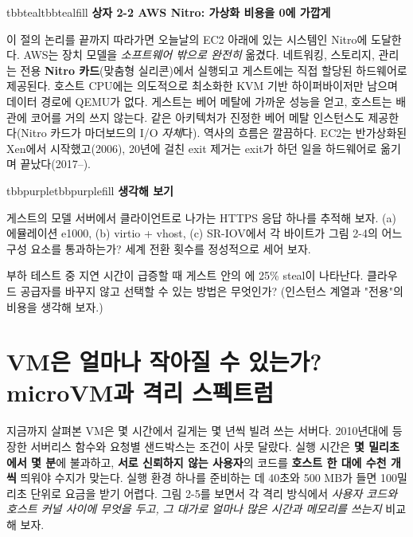 \begin{calloutbox}{tbbteal}{tbbtealfill}
{\normalsize\bfseries\color{tbbx115E59}상자 2-2  AWS Nitro: 가상화 비용을 0에 가깝게}\par\vspace{3pt}
이 절의 논리를 끝까지 따라가면 오늘날의 EC2 아래에 있는 시스템인 Nitro에 도달한다. AWS는 장치 모델을 \textit{소프트웨어 밖으로 완전히} 옮겼다. 네트워킹, 스토리지, 관리는 전용 \textbf{Nitro 카드}(맞춤형 실리콘)에서 실행되고 게스트에는 직접 할당된 하드웨어로 제공된다. 호스트 CPU에는 의도적으로 최소화한 KVM 기반 하이퍼바이저만 남으며 데이터 경로에 QEMU가 없다. 게스트는 베어 메탈에 가까운 성능을 얻고, 호스트는 배관에 코어를 거의 쓰지 않는다. 같은 아키텍처가 진정한 베어 메탈 인스턴스도 제공한다(Nitro 카드가 마더보드의 I/O \textit{자체}다). 역사의 흐름은 깔끔하다. EC2는 반가상화된 Xen에서 시작했고(2006), 20년에 걸친 exit 제거는 exit가 하던 일을 하드웨어로 옮기며 끝났다(2017–).
\end{calloutbox}

\vspace{3.0pt}

\begin{calloutbox}{tbbpurple}{tbbpurplefill}
{\normalsize\bfseries\color{tbbpurple}생각해 보기}\par\vspace{3pt}
\begin{tbbitemize}
  \item 게스트의 모델 서버에서 클라이언트로 나가는 HTTPS 응답 하나를 추적해 보자. (a) 에뮬레이션 e1000, (b) virtio + vhost, (c) SR-IOV에서 각 바이트가 그림 2-4의 어느 구성 요소를 통과하는가? 세계 전환 횟수를 정성적으로 세어 보자.
  \item 부하 테스트 중 지연 시간이 급증할 때 게스트 안의 에 25\% steal이 나타난다. 클라우드 공급자를 바꾸지 않고 선택할 수 있는 방법은 무엇인가? (인스턴스 계열과 "전용"의 비용을 생각해 보자.)
\end{tbbitemize}
\end{calloutbox}

\section{VM은 얼마나 작아질 수 있는가? microVM과 격리 스펙트럼}

지금까지 살펴본 VM은 몇 시간에서 길게는 몇 년씩 빌려 쓰는 서버다. 2010년대에 등장한 서버리스 함수와 요청별 샌드박스는 조건이 사뭇 달랐다. 실행 시간은 \textbf{몇 밀리초에서 몇 분}에 불과하고, \textbf{서로 신뢰하지 않는 사용자}의 코드를 \textbf{호스트 한 대에 수천 개씩} 띄워야 수지가 맞는다. 실행 환경 하나를 준비하는 데 40초와 500 MB가 들면 100밀리초 단위로 요금을 받기 어렵다. 그림 2-5를 보면서 각 격리 방식에서 \textit{사용자 코드와 호스트 커널 사이에 무엇을 두고, 그 대가로 얼마나 많은 시간과 메모리를 쓰는지} 비교해 보자.

